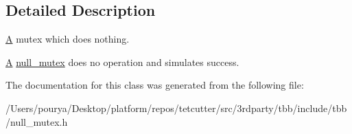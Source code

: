 \subsection{Detailed Description}
\hyperlink{structA}{A} mutex which does nothing. 

\hyperlink{structA}{A} \hyperlink{classtbb_1_1null__mutex}{null\+\_\+mutex} does no operation and simulates success. 

The documentation for this class was generated from the following file\+:\begin{DoxyCompactItemize}
\item 
/\+Users/pourya/\+Desktop/platform/repos/tetcutter/src/3rdparty/tbb/include/tbb/null\+\_\+mutex.\+h\end{DoxyCompactItemize}
